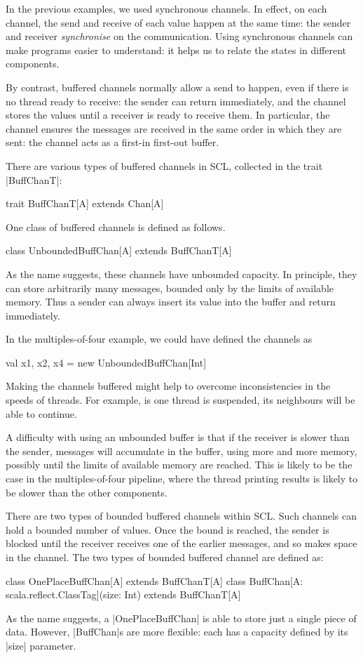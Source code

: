 In the previous examples, we used synchronous channels.  In effect, on each
channel, the send and receive of each value happen at the same time: the
sender and receiver \emph{synchronise} on the communication.
%
Using synchronous channels can make programs easier to understand: it helps us
to relate the states in different components.

By contrast, buffered channels normally allow a send to happen, even if there
is no thread ready to receive: the sender can return immediately, and the
channel stores the values until a receiver is ready to receive them.  In
particular, the channel ensures the messages are received in the same order in
which they are sent: the channel acts as a first-in first-out buffer.

There are various types of buffered channels in SCL, collected in the trait
|BuffChanT|: 
\begin{scala}
trait BuffChanT[A] extends Chan[A]
\end{scala}
%
One class of buffered channels is defined as follows. 
%
\begin{scala}
class UnboundedBuffChan[A] extends BuffChanT[A]
\end{scala}
%
As the name suggests, these channels have unbounded capacity. In principle,
they can store arbitrarily many messages, bounded only by the limits of
available memory.  Thus a sender can always insert its value into the buffer
and return immediately. 

In the multiples-of-four example, we could have defined the channels as 
%
\begin{scala}
  val x1, x2, x4 = new UnboundedBuffChan[Int]
\end{scala}
%
Making the channels buffered might help to overcome inconsistencies in the
speeds of threads.  For example, is one thread is suspended, its neighbours
will be able to continue.

A difficulty with using an unbounded buffer is that if the receiver is slower
than the sender, messages will accumulate in the buffer, using more and more
memory, possibly until the limits of available memory are reached.  This is
likely to be the case in the multiples-of-four pipeline, where the thread
printing results is likely to be slower than the other components. 

There are two types of bounded buffered channels within SCL\@.  Such channels
can hold a bounded number of values.  Once the bound is reached, the sender is
blocked until the receiver receives one of the earlier messages, and so makes
space in the channel.
%
The two types of bounded buffered channel are defined as:
%
\begin{scala}
class OnePlaceBuffChan[A] extends BuffChanT[A]
class BuffChan[A: scala.reflect.ClassTag](size: Int) extends BuffChanT[A]
\end{scala}
%
As the name suggests, a |OnePlaceBuffChan| is able to store just a single
piece of data.  However, |BuffChan|s are more flexible: each has a capacity
defined by its |size| parameter.

